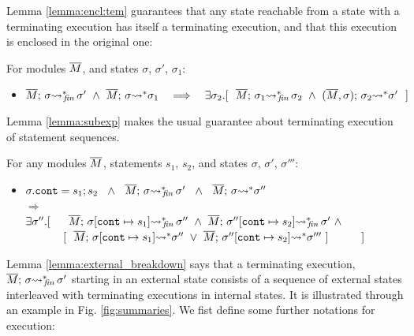 Lemma \ref{lemma:encl:tem} guarantees that any state reachable from a state with a terminating execution has itself a terminating execution, and that this execution is enclosed in the original one:
 
 \begin{auxLemma}
 \label{lemma:encl:tem}
 For   modules $\overline{M}$,   and states $\sigma$, $\sigma'$, $\sigma_1$:
\begin{itemize}
\item
$  \leadstoBoundedStarFin {\Mtwo}  {\sigma}  {\sigma'} \  \wedge \  \leadstoBoundedStar  {\Mtwo}  {\sigma}  {\sigma_1} 
\ \ \  \Longrightarrow\ \ \  %
 \exists \sigma_2.[\ \ \leadstoBoundedStarFin {\Mtwo} {\sigma_1}  {\sigma_2}  
\ \wedge\ 
\leadstoBoundedStarThree  {\Mtwo}  {\sigma_2}  {\sigma}   {\sigma'} \ \ ]$
\end{itemize}

\end{auxLemma} 
 
Lemma \ref{lemma:subexp} makes the usual guarantee about terminating execution of statement sequences.
  
\begin{auxLemma}
\label{lemma:subexp}
For any modules $\overline{M}$, statements $s_1$, $s_2$, and states $\sigma$, $\sigma'$, $\sigma'''$:
\begin{itemize}
\item
$ \sigma.\texttt{cont} = s_1; s_2 \ \ \wedge\ \  \leadstoBoundedStarFin {\Mtwo}  {\sigma}  {\sigma'}\ \ 
\wedge \ \
\leadstoBoundedStar {\Mtwo}  {\sigma}  {\sigma''}\
$\\
$  \Longrightarrow$\\
$   \exists \sigma''.[\ \ \ \ \   \leadstoBoundedStarFin {\Mtwo} {\sigma[\texttt{cont}\mapsto s_1]}  {\sigma''}  
\ \wedge\ 
\leadstoBoundedStarFin {\Mtwo} {\sigma''[\texttt{cont}\mapsto s_2]}   {\sigma'} \  \wedge$
\\
$\strut \hspace{1.2cm}  [ \ \ \overline{M};\, {\sigma[\texttt{cont}\mapsto s_1]} {\rightsquigarrow^*} \sigma''\ \vee \ \overline{M};\, {\sigma''[\texttt{cont}\mapsto s_2]} {\rightsquigarrow^*} \sigma'''\ ]\ \ \ \ \ \ \ \  \ ] $
\end{itemize}
\end{auxLemma}
 

Lemma \ref{lemma:external_breakdown} says that a terminating execution,  $ \overline{M};\, {\sigma} {\rightsquigarrow^*}\!\!_{\mathit{fin}}\, \sigma'$ starting in an external state  consists of a sequence of  external states interleaved with terminating executions in internal states. 
It %
is illustrated through an example in Fig. \ref{fig:summaries}.
We fist define some further notations for execution:

